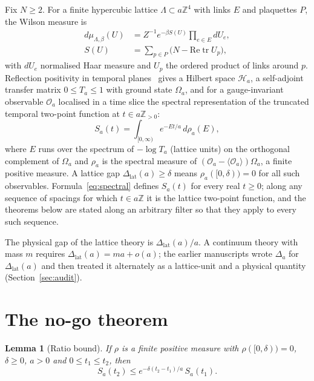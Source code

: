 \documentclass[aps,prd,twocolumn,superscriptaddress,nofootinbib,floatfix]{revtex4-2}
\newtheorem{lemma}[theorem]{Lemma}
\theoremstyle{definition}
\theoremstyle{remark}
\DeclareMathOperator{\Tr}{tr}
\newcommand{\cO}{\mathcal{O}}
\newcommand{\cH}{\mathcal{H}}
\newcommand{\Z}{\mathbb{Z}}
\newcommand{\Dlat}{\Delta_{\mathrm{lat}}}
\begin{document}
Fix $N\ge2$. For a finite hypercubic lattice $\Lambda\subset a\Z^4$ with
links $E$ and plaquettes $P$, the Wilson measure is
\begin{align}
d\mu_{\Lambda,\beta}(U)&=Z^{-1}e^{-\beta S(U)}\prod_{e\in E}dU_e,\nonumber\\
S(U)&=\sum_{p\in P}\bigl(N-\mathrm{Re}\Tr U_p\bigr),
\label{eq:wilson}
\end{align}
with $dU_e$ normalised Haar measure and $U_p$ the ordered product of links
around $p$. Reflection positivity in temporal planes~\cite{OSei78} gives a
Hilbert space $\cH_a$, a self-adjoint transfer matrix $0\le T_a\le1$ with
ground state $\Omega_a$, and for a gauge-invariant observable $\cO_a$
localised in a time slice the spectral representation of the truncated
temporal two-point function at $t\in a\Z_{>0}$:
\begin{equation}
S_a(t)=\int_{[0,\infty)}e^{-Et/a}\,d\rho_a(E),
\label{eq:spectral}
\end{equation}
where $E$ runs over the spectrum of $-\log T_a$ (lattice units) on the
orthogonal complement of $\Omega_a$ and $\rho_a$ is the spectral measure of
$(\cO_a-\langle\cO_a\rangle)\Omega_a$, a finite positive measure. A lattice
gap $\Dlat(a)\ge\delta$ means $\rho_a([0,\delta))=0$ for all such
observables. Formula~\eqref{eq:spectral} defines $S_a(t)$ for every real
$t\ge0$; along any sequence of spacings for which $t\in a\Z$ it is the
lattice two-point function, and the theorems below are stated along an
arbitrary filter so that they apply to every such sequence.

The physical gap of the lattice theory is $\Dlat(a)/a$. A continuum theory
with mass $m$ requires $\Dlat(a)=ma+o(a)$; the earlier manuscripts wrote
$\Delta_a$ for $\Dlat(a)$ and then treated it alternately as a lattice-unit
and a physical quantity (Section~\ref{sec:audit}).

\section{The no-go theorem}
\label{sec:nogo}

\begin{lemma}[Ratio bound]
\label{lem:ratio}
If $\rho$ is a finite positive measure with $\rho([0,\delta))=0$, $\delta\ge0$,
$a>0$ and $0\le t_1\le t_2$, then
\begin{equation}
S_a(t_2)\le e^{-\delta(t_2-t_1)/a}\,S_a(t_1).
\label{eq:ratio}
\end{equation}
\end{lemma}
\end{document}

